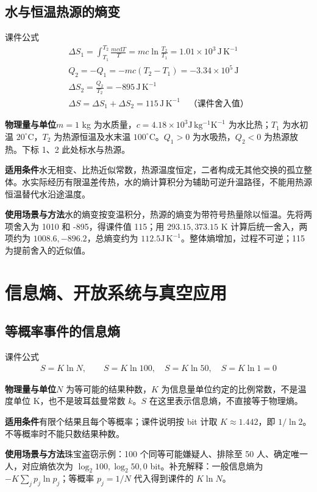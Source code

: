 \documentclass[UTF8,fontset=none,zihao=-4,a4paper]{ctexart}
\newcommand{\chapterpage}[1]{\clearpage\section{#1}}
\newcommand{\unit}[1]{\,\mathrm{#1}}
\newcommand{\explain}[3]{\par\noindent\textbf{物理量与单位}\quad #1\par
\noindent\textbf{适用条件}\quad #2\par
\noindent\textbf{使用场景与方法}\quad #3\par}
\begin{document}
\Needspace{360pt}
\par\noindent\begin{minipage}{\linewidth}
\subsection{水与恒温热源的熵变}
\begin{infobox}[breakable=false]{课件公式}
\begin{gather*}\Delta S_1=\int_{T_1}^{T_2}\frac{mc\mathrm dT}T=mc\ln\frac{T_2}{T_1}=1.01\times10^3\unit{J\,K^{-1}}\\Q_2=-Q_1=-mc(T_2-T_1)=-3.34\times10^5\unit J\\\Delta S_2=\frac{Q_2}{T_2}=-895\unit{J\,K^{-1}}\\\Delta S=\Delta S_1+\Delta S_2=115\unit{J\,K^{-1}}\quad\text{（课件舍入值）}\end{gather*}
\end{infobox}
\end{minipage}\par
\explain{$m=1$ kg 为水质量，$c=4.18\times10^3\mathrm{J\,kg^{-1}K^{-1}}$ 为水比热；$T_1$ 为水初温 $20^\circ$C，$T_2$ 为热源恒温及水末温 $100^\circ$C。$Q_1>0$ 为水吸热，$Q_2<0$ 为热源放热。下标 1、2 此处标水与热源。}{水无相变、比热近似常数，热源温度恒定，二者构成无其他交换的孤立整体。水实际经历有限温差传热，水的熵计算积分为辅助可逆升温路径，不能用热源恒温替代水沿途温度。}{水的熵变按变温积分，热源的熵变为带符号热量除以恒温。先将两项舍入为 1010 和 -895，得课件值 115；用 $293.15,373.15$ K 计算后统一舍入，两项约为 $1008.6,-896.2$，总熵变约为 $112.5\mathrm{J\,K^{-1}}$。整体熵增加，过程不可逆；115 为提前舍入的近似值。}


\chapterpage{信息熵、开放系统与真空应用}
\par\noindent\begin{minipage}{\linewidth}
\subsection{等概率事件的信息熵}
\begin{infobox}[breakable=false]{课件公式}
\begin{gather*}S=K\ln N,\qquad S=K\ln100,\quad S=K\ln50,\quad S=K\ln1=0\end{gather*}
\end{infobox}
\end{minipage}\par
\explain{$N$ 为等可能的结果种数，$K$ 为信息量单位约定的比例常数，不是温度单位 K，也不是玻耳兹曼常数 $k$。$S$ 在这里表示信息熵，不直接等于物理熵。}{有限个结果且每个等概率；课件说明按 bit 计取 $K\approx1.442$，即 $1/\ln2$。不等概率时不能只数结果种数。}{珠宝盗窃示例：100 个同等可能嫌疑人、排除至 50 人、确定唯一人，对应熵依次为 $\log_2 100,\log_2 50,0$ bit。补充解释：一般信息熵为 $-K\sum_jp_j\ln p_j$；等概率 $p_j=1/N$ 代入得到课件的 $K\ln N$。}
\end{document}
